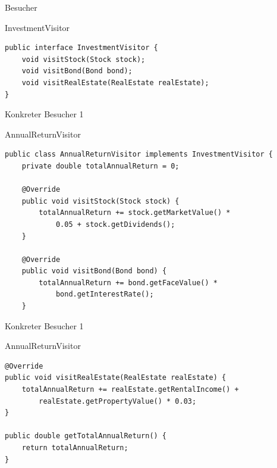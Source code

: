 
\begin{frame}[fragile]{Besucher}
	\begin{exampleblock}{InvestmentVisitor}
 		\begin{lstlisting}
public interface InvestmentVisitor {
	void visitStock(Stock stock);
	void visitBond(Bond bond);
	void visitRealEstate(RealEstate realEstate);
}
        \end{lstlisting}
 	\end{exampleblock}
\end{frame}

\begin{frame}[fragile]{Konkreter Besucher 1}
	\begin{exampleblock}{AnnualReturnVisitor}
 		\begin{lstlisting}
public class AnnualReturnVisitor implements InvestmentVisitor {
	private double totalAnnualReturn = 0;

	@Override
	public void visitStock(Stock stock) {
		totalAnnualReturn += stock.getMarketValue() * 
            0.05 + stock.getDividends();
	}

	@Override
	public void visitBond(Bond bond) {
		totalAnnualReturn += bond.getFaceValue() * 
            bond.getInterestRate();
	}
 		\end{lstlisting}
 	\end{exampleblock}
\end{frame}

\begin{frame}[fragile]{Konkreter Besucher 1}
	\begin{exampleblock}{AnnualReturnVisitor}
 		\begin{lstlisting}
@Override
public void visitRealEstate(RealEstate realEstate) {
    totalAnnualReturn += realEstate.getRentalIncome() +
        realEstate.getPropertyValue() * 0.03;
}

public double getTotalAnnualReturn() {
    return totalAnnualReturn;
}
 		\end{lstlisting}
 	\end{exampleblock}
\end{frame}


